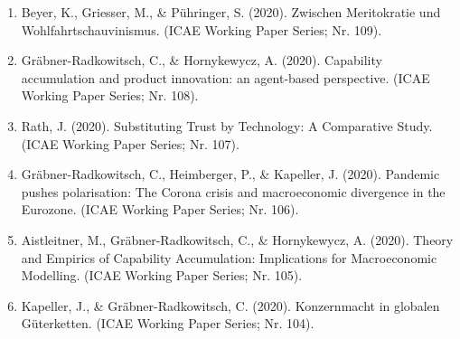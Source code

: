 \begin{enumerate}
	 \item Beyer, K., Griesser, M., \& Pühringer, S. (2020). Zwischen Meritokratie und Wohlfahrtschauvinismus. (ICAE Working Paper Series; Nr. 109).
	 \item Gräbner-Radkowitsch, C., \& Hornykewycz, A. (2020). Capability accumulation and product innovation: an agent-based perspective. (ICAE Working Paper Series; Nr. 108).
	 \item Rath, J. (2020). Substituting Trust by Technology: A Comparative Study. (ICAE Working Paper Series; Nr. 107).
	 \item Gräbner-Radkowitsch, C., Heimberger, P., \& Kapeller, J. (2020). Pandemic pushes polarisation: The Corona crisis and macroeconomic divergence in the Eurozone. (ICAE Working Paper Series; Nr. 106).
	 \item Aistleitner, M., Gräbner-Radkowitsch, C., \& Hornykewycz, A. (2020). Theory and Empirics of Capability Accumulation: Implications for Macroeconomic Modelling. (ICAE Working Paper Series; Nr. 105).
	 \item Kapeller, J., \& Gräbner-Radkowitsch, C. (2020). Konzernmacht in globalen Güterketten. (ICAE Working Paper Series; Nr. 104).
\end{enumerate}
